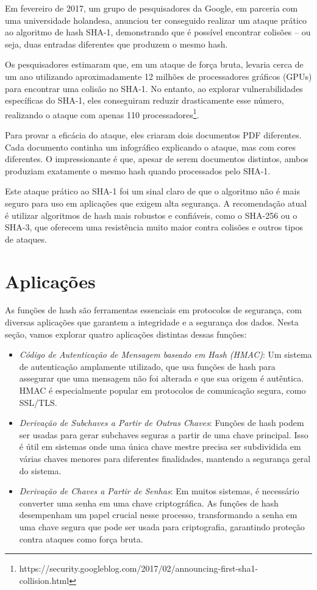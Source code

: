 Em fevereiro de 2017, um grupo de pesquisadores da Google, em parceria com uma universidade holandesa, anunciou ter conseguido realizar um ataque prático ao algoritmo de hash SHA-1, demonstrando que é possível encontrar colisões -- ou seja, duas entradas diferentes que produzem o mesmo hash.

Os pesquisadores estimaram que, em um ataque de força bruta, levaria cerca de um ano utilizando aproximadamente 12 milhões de processadores gráficos (GPUs) para encontrar uma colisão no SHA-1.
No entanto, ao explorar vulnerabilidades específicas do SHA-1, eles conseguiram reduzir drasticamente esse número, realizando o ataque com apenas 110 processadores\footnote{https://security.googleblog.com/2017/02/announcing-first-sha1-collision.html}.

Para provar a eficácia do ataque, eles criaram dois documentos PDF diferentes.
Cada documento continha um infográfico explicando o ataque, mas com cores diferentes.
O impressionante é que, apesar de serem documentos distintos, ambos produziam exatamente o mesmo hash quando processados pelo SHA-1.

Este ataque prático ao SHA-1 foi um sinal claro de que o algoritmo não é mais seguro para uso em aplicações que exigem alta segurança.
A recomendação atual é utilizar algoritmos de hash mais robustos e confiáveis, como o SHA-256 ou o SHA-3, que oferecem uma resistência muito maior contra colisões e outros tipos de ataques.

\section{Aplicações}
\label{sec:aplicacoes}

As funções de hash são ferramentas essenciais em protocolos de segurança, com diversas aplicações que garantem a integridade e a segurança dos dados.
Nesta seção, vamos explorar quatro aplicações distintas dessas funções:

\begin{itemize}
\item[] {\em Código de Autenticação de Mensagem baseado em Hash (HMAC)}:
  Um sistema de autenticação amplamente utilizado, que usa funções de hash para assegurar que uma mensagem não foi alterada e que sua origem é autêntica.
  HMAC é especialmente popular em protocolos de comunicação segura, como SSL/TLS.

\item[] {\em Derivação de Subchaves a Partir de Outras Chaves}:
  Funções de hash podem ser usadas para gerar subchaves seguras a partir de uma chave principal.
  Isso é útil em sistemas onde uma única chave mestre precisa ser subdividida em várias chaves menores para diferentes finalidades, mantendo a segurança geral do sistema.

\item[] {\em Derivação de Chaves a Partir de Senhas}:
  Em muitos sistemas, é necessário converter uma senha em uma chave criptográfica.
  As funções de hash desempenham um papel crucial nesse processo, transformando a senha em uma chave segura que pode ser usada para criptografia, garantindo proteção contra ataques como força bruta.
\end{itemize}
  
